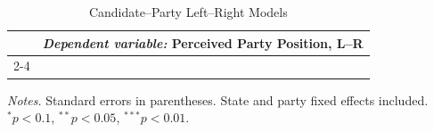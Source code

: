 \begin{table}[!htbp]\centering
\caption{Candidate--Party Left--Right Models}
\label{tab:cand_party_lr}
\begin{tabular}{lccc}
\toprule
 & \multicolumn{3}{c}{\textit{Dependent variable:} Perceived Party Position, L--R} \\
\cmidrule(lr){2-4}
\bottomrule
\end{tabular}
\vspace{0.2em}
{\footnotesize \textit{Notes.} Standard errors in parentheses. State and party fixed effects included. \\$^{*}p<0.1$, $^{**}p<0.05$, $^{***}p<0.01$.}
\end{table}

